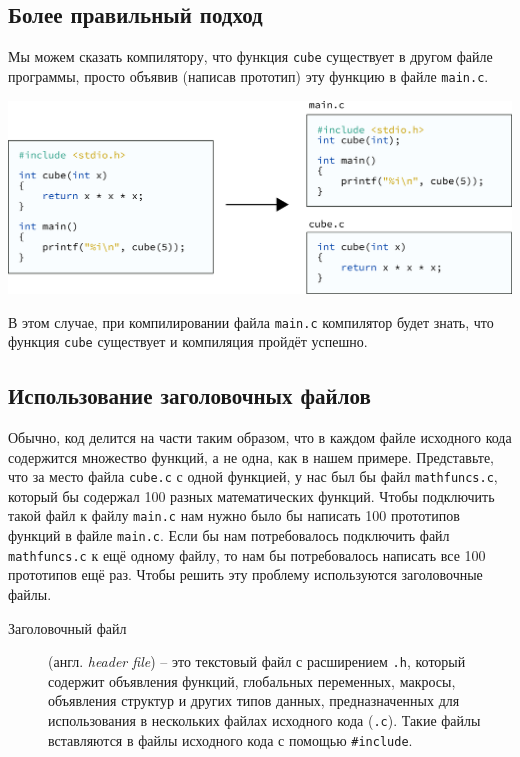 \documentclass{article}
\begin{document}
\subsection*{Более правильный подход}
Мы можем сказать компилятору, что функция \texttt{cube} существует в другом файле программы, просто объявив (написав прототип) эту функцию в файле \texttt{main.c}.
\begin{center}
\includegraphics[scale=0.85]{../images/05main_cube_separate2.png}
\end{center}
В этом случае, при компилировании файла \texttt{main.c} компилятор будет знать, что функция \texttt{cube} существует и компиляция пройдёт успешно.

\subsection*{Использование заголовочных файлов}
Обычно, код делится на части таким образом, что в каждом файле исходного кода содержится множество функций, а не одна, как в нашем примере. Представьте, что за место файла \texttt{cube.c} с одной функцией, у нас был бы файл \texttt{mathfuncs.c}, который бы содержал 100 разных математических функций. Чтобы подключить такой файл к файлу \texttt{main.c} нам нужно было бы написать 100 прототипов функций в файле \texttt{main.c}. Если бы нам потребовалось подключить файл \texttt{mathfuncs.c} к ещё одному файлу, то нам бы потребовалось написать все 100 прототипов ещё раз. Чтобы решить эту проблему используются заголовочные файлы.

\begin{description}
\item[Заголовочный файл] (англ. \textit{header file}) -- это текстовый файл с расширением \texttt{.h}, который содержит объявления функций, глобальных переменных, макросы, объявления структур и других типов данных, предназначенных для использования в нескольких файлах исходного кода (\texttt{.c}). Такие файлы вставляются в файлы исходного кода с помощью \texttt{\#include}.
\end{description}
\end{document}
